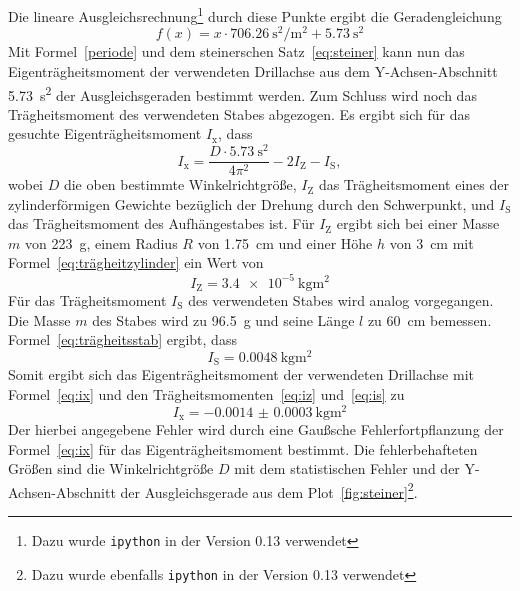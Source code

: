 Die lineare Ausgleichsrechnung\footnote{Dazu wurde 
\texttt{ipython} in der Version 0.13  verwendet} durch diese 
Punkte ergibt die Geradengleichung 
%
\begin{equation}
f(x) = x\cdot\SI{706.26}{\second^2\per\metre^2} + \SI{5.73}{\second^2}
\end{equation}
%
Mit Formel~\eqref{periode} und dem steinerschen Satz~\eqref{eq:steiner}
kann nun das Eigenträgheitsmoment der verwendeten Drillachse aus dem 
Y-Achsen-Abschnitt \SI{5.73}{\second^2} der Ausgleichsgeraden bestimmt werden.
Zum Schluss wird noch das Trägheitsmoment des verwendeten Stabes abgezogen.
Es ergibt sich für das gesuchte Eigenträgheitsmoment $I_\text{x}$, dass
%
\begin{equation}
I_\text{x} = \frac{D\cdot\SI{5.73}{\second^2}}{4\pi^2} - 2I_\text{Z} - I_\text{S},
\label{eq:ix}
\end{equation}
%
wobei $D$ die oben bestimmte Winkelrichtgröße, $I_\text{Z}$ das Trägheitsmoment 
eines der zylinderförmigen Gewichte bezüglich der Drehung durch den Schwerpunkt,
 und $I_\text{S}$ das Trägheitsmoment des Aufhängestabes ist.
Für $I_\text{Z}$ ergibt sich bei einer Masse $m$ von \SI{223}{\gram}, einem Radius 
$R$ von \SI{1.75}{\centi\metre} und einer Höhe $h$ von \SI{3}{\centi\metre} mit 
Formel~\eqref{eq:trägheitzylinder} ein Wert von 
%
\begin{equation}
I_\text{Z} = \SI{3.4e-5}{\kilo\gram\metre^2}
\label{eq:iz}
\end{equation}
%
Für das Trägheitsmoment $I_\text{S}$ des verwendeten Stabes wird analog 
vorgegangen. Die Masse $m$ des Stabes wird zu \SI{96.5}{\gram} und seine 
Länge $l$ zu \SI{60}{\centi\metre} bemessen. Formel~\eqref{eq:trägheitsstab}
ergibt, dass
%
\begin{equation}
I_\text{S} = \SI{0.0048}{\kilo\gram\metre^2}
\label{eq:is}
\end{equation}
%
Somit ergibt sich das Eigenträgheitsmoment der verwendeten Drillachse mit 
Formel~\eqref{eq:ix} und den Trägheitsmomenten~\eqref{eq:iz} und~\eqref{eq:is} 
zu
%
\begin{equation}
I_\text{x} = \SI{-0.0014(3)}{\kilo\gram\metre^2}
\end{equation}
%
Der hierbei angegebene Fehler wird durch eine Gaußsche Fehlerfortpflanzung 
der Formel~\eqref{eq:ix} für das Eigenträgheitsmoment bestimmt. Die 
fehlerbehafteten Größen sind die Winkelrichtgröße $D$ mit dem statistischen 
Fehler und der Y-Achsen-Abschnitt der Ausgleichsgerade aus dem 
Plot~\ref{fig:steiner}\footnote{Dazu wurde ebenfalls \texttt{ipython} 
in der Version 0.13  verwendet}.
%
\FloatBarrier

